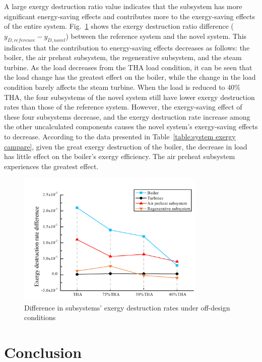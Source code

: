 \documentclass[preprint,12pt]{elsarticle}
\begin{document}
A large exergy destruction ratio value indicates that the subsystem has more significant energy-saving effects and contributes more to the exergy-saving effects of the entire system.
Fig.~\ref{fig:partload_subsys_exergyrate} shows the exergy destruction ratio difference ($y_{D,reference}-y_{D,novel}$) between the reference system and the novel system.
This indicates that the contribution to energy-saving effects decreases as follows: the boiler, the air preheat subsystem, the regenerative subsystem, and the steam turbine.
As the load decreases from the THA load condition, it can be seen that the load change has the greatest effect on the boiler, while the change in the load condition barely affects the steam turbine.
When the load is reduced to 40\% THA, the four subsystems of the novel system still have lower exergy destruction rates than those of the reference system.
However, the exergy-saving effect of these four subsystems decrease, and the exergy destruction rate increase among the other uncalculated components causes the novel system's exergy-saving effects to decrease.
According to the data presented in Table~\ref{table:system exergy campare}, given the great exergy destruction of the boiler, the decrease in load has little effect on the boiler's exergy efficiency. The air preheat subsystem experiences the greatest effect.


\begin{figure}[htbp]
\centering
\includegraphics[width=0.8\textwidth]{fig/partload_subsys_exergyrate.png}
\caption{Difference in subsystems' exergy destruction rates under off-design conditions} 
\label{fig:partload_subsys_exergyrate}
\end{figure}


\section{Conclusion}
\end{document}
